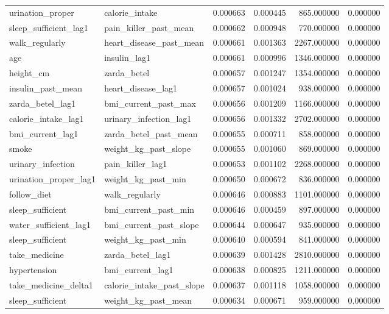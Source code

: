 \begin{longtable}{llrrrr}
urination\_proper & calorie\_intake & 0.000663 & 0.000445 & 865.000000 & 0.000000 \\
sleep\_sufficient\_lag1 & pain\_killer\_past\_mean & 0.000662 & 0.000948 & 770.000000 & 0.000000 \\
walk\_regularly & heart\_disease\_past\_mean & 0.000661 & 0.001363 & 2267.000000 & 0.000000 \\
age & insulin\_lag1 & 0.000661 & 0.000996 & 1346.000000 & 0.000000 \\
height\_cm & zarda\_betel & 0.000657 & 0.001247 & 1354.000000 & 0.000000 \\
insulin\_past\_mean & heart\_disease\_lag1 & 0.000657 & 0.001024 & 938.000000 & 0.000000 \\
zarda\_betel\_lag1 & bmi\_current\_past\_max & 0.000656 & 0.001209 & 1166.000000 & 0.000000 \\
calorie\_intake\_lag1 & urinary\_infection\_lag1 & 0.000656 & 0.001332 & 2702.000000 & 0.000000 \\
bmi\_current\_lag1 & zarda\_betel\_past\_mean & 0.000655 & 0.000711 & 858.000000 & 0.000000 \\
smoke & weight\_kg\_past\_slope & 0.000655 & 0.001060 & 869.000000 & 0.000000 \\
urinary\_infection & pain\_killer\_lag1 & 0.000653 & 0.001102 & 2268.000000 & 0.000000 \\
urination\_proper\_lag1 & weight\_kg\_past\_min & 0.000650 & 0.000672 & 836.000000 & 0.000000 \\
follow\_diet & walk\_regularly & 0.000646 & 0.000883 & 1101.000000 & 0.000000 \\
sleep\_sufficient & bmi\_current\_past\_min & 0.000646 & 0.000459 & 897.000000 & 0.000000 \\
water\_sufficient\_lag1 & bmi\_current\_past\_slope & 0.000644 & 0.000647 & 935.000000 & 0.000000 \\
sleep\_sufficient & weight\_kg\_past\_min & 0.000640 & 0.000594 & 841.000000 & 0.000000 \\
take\_medicine & zarda\_betel\_lag1 & 0.000639 & 0.001428 & 2810.000000 & 0.000000 \\
hypertension & bmi\_current\_lag1 & 0.000638 & 0.000825 & 1211.000000 & 0.000000 \\
take\_medicine\_delta1 & calorie\_intake\_past\_slope & 0.000637 & 0.001118 & 1058.000000 & 0.000000 \\
sleep\_sufficient & weight\_kg\_past\_mean & 0.000634 & 0.000671 & 959.000000 & 0.000000 \\

\end{longtable}
